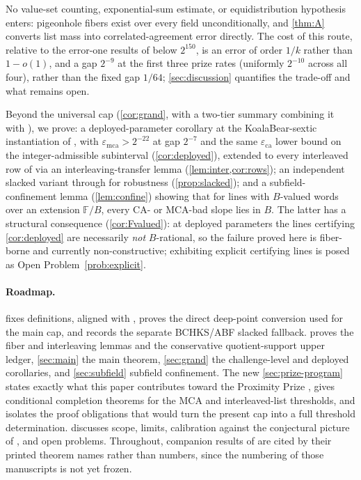 \documentclass[11pt]{article}
\theoremstyle{definition}
\theoremstyle{remark}
\newcommand{\F}{\mathbb{F}}
\newcommand{\B}{B}
\newcommand{\eca}{\varepsilon_{\mathrm{ca}}}
\newcommand{\emca}{\varepsilon_{\mathrm{mca}}}
\begin{document}
No value-set counting, exponential-sum estimate, or equidistribution hypothesis enters: pigeonhole fibers exist over every field unconditionally, and \cref{thm:A} converts list mass into correlated-agreement error directly. The cost of this route, relative to the error-one results of \cite{Cho26a,Cho26b} below $2^{150}$, is an error of order $1/k$ rather than $1-o(1)$, and a gap $2^{-9}$ at the first three prize rates (uniformly $2^{-10}$ across all four), rather than the fixed gap $1/64$; \cref{sec:discussion} quantifies the trade-off and what remains open.

Beyond the universal cap (\cref{cor:grand}, with a two-tier summary combining it with \cite{Cho26b}), we prove: a deployed-parameter corollary at the KoalaBear-sextic instantiation of \cite[\S6.3]{ABF26}, with $\emca>2^{-22}$ at gap $2^{-7}$ and the same $\eca$ lower bound on the integer-admissible subinterval (\cref{cor:deployed}), extended to every interleaved row of \cite[Tables~2--3]{ABF26} via an interleaving-transfer lemma (\cref{lem:inter,cor:rows}); an independent slacked variant through \cite[Thm.~1.9]{BCHKS25} for robustness (\cref{prop:slacked}); and a subfield-confinement lemma (\cref{lem:confine}) showing that for lines with $\B$-valued words over an extension $\F/\B$, every CA- or MCA-bad slope lies in $\B$. The latter has a structural consequence (\cref{cor:Fvalued}): at deployed parameters the lines certifying \cref{cor:deployed} are necessarily \emph{not} $\B$-rational, so the failure proved here is fiber-borne and currently non-constructive; exhibiting explicit certifying lines is posed as Open Problem~\ref{prob:explicit}.

\paragraph{Roadmap.}  fixes definitions, aligned with \cite[Defs.~4.1, 4.3]{ABF26}, proves the direct deep-point conversion used for the main cap, and records the separate BCHKS/ABF slacked fallback.  proves the fiber and interleaving lemmas and the conservative quotient-support upper ledger, \cref{sec:main} the main theorem, \cref{sec:grand} the challenge-level and deployed corollaries, and \cref{sec:subfield} subfield confinement. The new \cref{sec:prize-program} states exactly what this paper contributes toward the Proximity Prize \cite{ProximityPrize}, gives conditional completion theorems for the MCA and interleaved-list thresholds, and isolates the proof obligations that would turn the present cap into a full threshold determination.  discusses scope, limits, calibration against the conjectural picture of \cite{Cho26b}, and open problems. Throughout, companion results of \cite{Cho26a,Cho26b} are cited by their printed theorem names rather than numbers, since the numbering of those manuscripts is not yet frozen.
\end{document}
